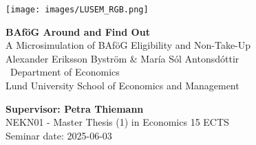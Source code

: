 
\sloppy  %

\texttt{[image: images/LUSEM\_RGB.png]} %

\vspace{2cm}
\begin{center}       
    \vspace*{2cm}
    {\LARGE \textbf{BAföG Around and Find Out} \\ 
     \large A Microsimulation of BAföG Eligibility and Non-Take-Up} \\
    \vspace{1cm}
    Alexander Eriksson Byström \& María Sól Antonsdóttir \\[0.3cm]
    \ \normalsize  Department of Economics \\ 
    Lund University School of Economics and Management
\end{center}
\vspace{2cm}

\vfill
\noindent 
\textbf{Supervisor: Petra Thiemann} \\ 
NEKN01 - Master Thesis (1) in Economics 15 ECTS \\ 
Seminar date: 2025-06-03
\thispagestyle{empty}

\fussy  %

\newpage

\begingroup
    \tableofcontents
\endgroup

\thispagestyle{empty}



